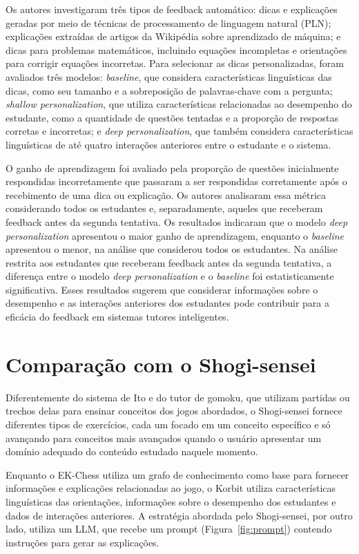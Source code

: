 Os autores investigaram três tipos de feedback automático: dicas e explicações geradas por meio de técnicas de processamento de linguagem natural (PLN); explicações extraídas de artigos da Wikipédia sobre aprendizado de máquina; e dicas para problemas matemáticos, incluindo equações incompletas e orientações para corrigir equações incorretas. Para selecionar as dicas personalizadas, foram avaliados três modelos: \textit{baseline}, que considera características linguísticas das dicas, como seu tamanho e a sobreposição de palavras-chave com a pergunta; \textit{shallow personalization}, que utiliza características relacionadas ao desempenho do estudante, como a quantidade de questões tentadas e a proporção de respostas corretas e incorretas; e \textit{deep personalization}, que também considera características linguísticas de até quatro interações anteriores entre o estudante e o sistema.

O ganho de aprendizagem foi avaliado pela proporção de questões inicialmente respondidas incorretamente que passaram a ser respondidas corretamente após o recebimento de uma dica ou explicação. Os autores analisaram essa métrica considerando todos os estudantes e, separadamente, aqueles que receberam feedback antes da segunda tentativa. Os resultados indicaram que o modelo \textit{deep personalization} apresentou o maior ganho de aprendizagem, enquanto o \textit{baseline} apresentou o menor, na análise que considerou todos os estudantes. Na análise restrita aos estudantes que receberam feedback antes da segunda tentativa, a diferença entre o modelo \textit{deep personalization} e o \textit{baseline} foi estatisticamente significativa. Esses resultados sugerem que considerar informações sobre o desempenho e as interações anteriores dos estudantes pode contribuir para a eficácia do feedback em sistemas tutores inteligentes.  

\section{Comparação com o Shogi-sensei}
Diferentemente do sistema de Ito e do tutor de gomoku, que utilizam partidas ou trechos delas para ensinar conceitos dos jogos abordados, o Shogi-sensei fornece diferentes
tipos de exercícios, cada um focado em um conceito específico e só avançando para conceitos mais avançados quando o usuário apresentar um domínio adequado do conteúdo
estudado naquele momento.

Enquanto o EK-Chess utiliza um grafo de conhecimento como base para fornecer informações e explicações relacionadas ao jogo, o Korbit utiliza características linguísticas das 
orientações, informações sobre o desempenho dos estudantes e dados de interações anteriores. A estratégia abordada pelo Shogi-sensei, por outro lado, utiliza um LLM, que 
recebe um prompt (Figura~\ref{fig:prompt}) contendo instruções para gerar as explicações.  

